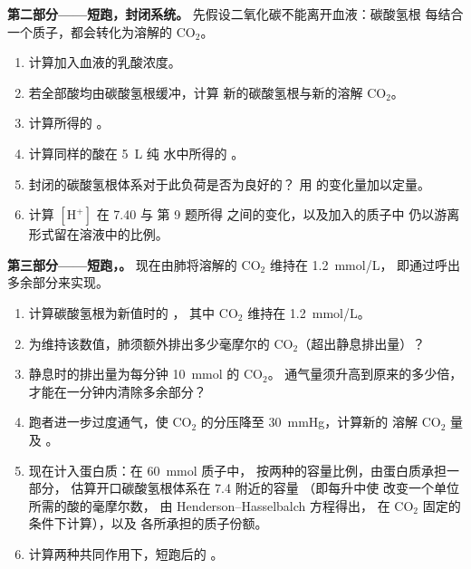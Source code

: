 \begin{problem}
\medskip
\noindent\textbf{第二部分——短跑，封闭系统。}
先假设二氧化碳不能离开血液：碳酸氢根
每结合一个质子，都会转化为溶解的 $\mathrm{CO_2}$。
\begin{enumerate}[resume]
  \item 计算加入血液的乳酸浓度。
  \item 若全部酸均由碳酸氢根缓冲，计算
        新的碳酸氢根与新的溶解 $\mathrm{CO_2}$。
  \item 计算所得的 。
  \item 计算同样的酸在 \qty{5}{L} 纯
        水中所得的 。
  \item 封闭的碳酸氢根体系对于此负荷是否为良好的？
        用  的变化量加以定量。
  \item 计算 $[\mathrm{H^+}]$ 在  7.40 与
        第 9 题所得  之间的变化，以及加入的质子中
        仍以游离形式留在溶液中的比例。
\end{enumerate}

\medskip
\noindent\textbf{第三部分——短跑，。}
现在由肺将溶解的 $\mathrm{CO_2}$ 维持在 \qty{1.2}{mmol/L}，
即通过呼出多余部分来实现。
\begin{enumerate}[resume]
  \item 计算碳酸氢根为新值时的 ，
        其中 $\mathrm{CO_2}$ 维持在 \qty{1.2}{mmol/L}。
  \item 为维持该数值，肺须额外排出多少毫摩尔的
        $\mathrm{CO_2}$（超出静息排出量）？
  \item 静息时的排出量为每分钟 \qty{10}{mmol} 的 $\mathrm{CO_2}$。
        通气量须升高到原来的多少倍，
        才能在一分钟内清除多余部分？
  \item 跑者进一步过度通气，使
        $\mathrm{CO_2}$ 的分压降至 \qty{30}{mmHg}，计算新的
        溶解 $\mathrm{CO_2}$ 量及 。
  \item 现在计入蛋白质：在 \qty{60}{mmol} 质子中，
        按两种的容量比例，由蛋白质承担一部分，
        估算开口碳酸氢根体系在  7.4 附近的容量
        （即每升中使  改变一个单位所需的酸的毫摩尔数，
        由 Henderson--Hasselbalch 方程得出，
        在 $\mathrm{CO_2}$ 固定的条件下计算），以及
        各所承担的质子份额。
  \item 计算两种共同作用下，短跑后的 。
\end{enumerate}


\end{problem}

